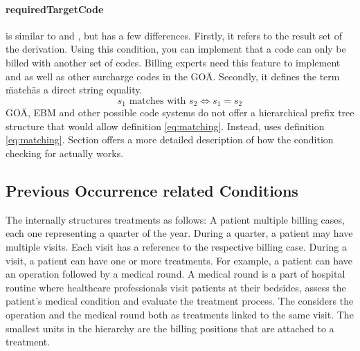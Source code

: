 \paragraph{requiredTargetCode}

 is similar to  and , but has a few differences.
Firstly, it refers to the result set of the derivation.
Using this condition, you can implement that a code can only be billed with another set of codes.
Billing experts need this feature to implement  and  as well as other surcharge codes in the GOÄ.
Secondly, it defines the term \"match\" as a direct string equality.
\begin{equation}
    \label{eq:matching-string-equals}
    s_1 \text{ matches with } s_2 \iff s_1 = s_2
\end{equation}
GOÄ, EBM and other possible code systems do not offer a hierarchical prefix tree structure that would allow definition \ref{eq:matching}.
Instead,  uses definition \ref{eq:matching}.
Section \addref offers a more detailed description of how the condition checking for  actually works.

\subsection{Previous Occurrence related Conditions}\label{subsec:previous-occurrence-related}

The \AVS internally structures treatments as follows:
A patient multiple billing cases, each one representing a quarter of the year.
During a quarter, a patient may have multiple visits.
Each visit has a reference to the respective billing case.
During a visit, a patient can have one or more treatments.
For example, a patient can have an operation followed by a medical round.
A medical round is a part of hospital routine where healthcare professionals visit patients at their bedsides,
assess the patient's medical condition and evaluate the treatment process.
The \AVS considers the operation and the medical round both as treatments linked to the same visit.
The smallest units in the hierarchy are the billing positions that are attached to a treatment.

